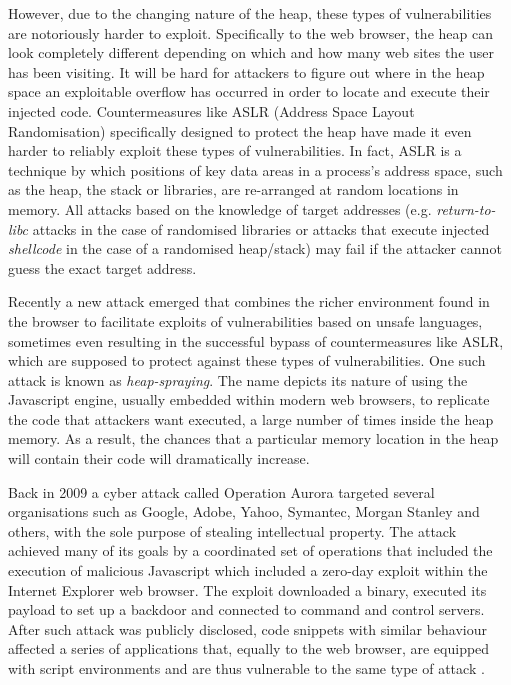 However, due to the changing nature of the heap, these types of vulnerabilities are notoriously harder to exploit.
Specifically to the web browser, the heap can look completely different depending on which and how many web sites the user has been visiting. It will be hard for attackers to figure out where in the heap space an exploitable overflow has occurred in order to locate  and execute their injected code.
Countermeasures like ASLR (Address Space Layout Randomisation) \cite{Bhatkar:2003:AOE} specifically designed to protect the heap have made it even harder to reliably exploit these types of vulnerabilities. In fact, ASLR is a technique by which positions of key data areas in a process's address space, such as the heap, the stack or libraries, are re-arranged at random locations in memory. 
All attacks based on the knowledge of target addresses (e.g. \emph{return-to-libc} attacks in the case of randomised libraries or attacks that execute injected \emph{shellcode} in the case of a randomised heap/stack) may fail if the attacker cannot guess the exact target address.

Recently a new attack emerged that combines the richer environment found in the browser to facilitate exploits of vulnerabilities based on unsafe languages, sometimes even resulting in the successful bypass of countermeasures like ASLR, which are supposed to protect against these types of vulnerabilities.
One such attack is known as \textit{heap-spraying}. The name depicts its nature of using the Javascript engine, usually embedded within modern web browsers, to replicate the code that attackers want executed, a large number of times inside the heap memory. As a result, the chances that a particular memory location in the heap will contain their code will dramatically increase. 

Back in 2009 a cyber attack called Operation Aurora \cite{aurora} targeted several organisations such as Google, Adobe, Yahoo, Symantec, Morgan Stanley and others, with the sole purpose of stealing intellectual property. The attack achieved many of its goals by a coordinated set of operations that included the execution of malicious Javascript which included a zero-day exploit within the Internet Explorer web browser. The exploit downloaded a binary, executed its payload to set up a backdoor and connected to command and control servers.
After such attack was publicly disclosed, code snippets with similar behaviour affected a series of applications that, equally to the web browser, are equipped with script environments and are thus vulnerable to the same type of attack \cite{iespray,safarispray,ffspray}.

